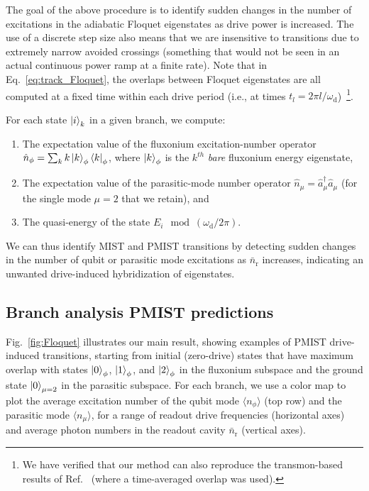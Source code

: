 \documentclass[%
reprint,
superscriptaddress,
 amsmath,amssymb,
 aps,
 prx,
longbibliography,
floatfix,
]{revtex4-2}
\begin{document}
The goal of the above procedure is to identify sudden changes in the number of excitations in the adiabatic Floquet eigenstates as drive power is increased.  
The use of a discrete step size also means that we are insensitive to transitions due to extremely narrow avoided crossings (something that would not be seen in an actual continuous power ramp at a finite rate). Note that in Eq.~\ref{eq:track_Floquet}, the overlaps between Floquet eigenstates are all computed at a fixed time within each drive period (i.e., at times $t_l = 2 \pi l/ \omega_\textrm{d}$)~\footnote{We have verified that our method can also reproduce the transmon-based results of Ref.~\cite{dumas2024unified} (where a time-averaged overlap was used).}. 


For each state $\ket{i}_k$ in a given branch, we compute:
\begin{enumerate}
    \item The expectation value of the fluxonium excitation-number operator $\hat n_\phi=\sum_k k\ket{k}_\phi\bra{k}_\phi$, where $\ket{k}_\phi$ is the $k^{th}$ {\it bare} fluxonium energy eigenstate,
    \item The expectation value of the parasitic-mode number operator $\hat n_\mu=\hat a_{\mu}^\dagger \hat a_{\mu}$ (for the single mode $\mu=2$ that we retain), and 
    \item The quasi-energy of the state $E_i \mod (\omega_\textrm{d}/2\pi)$.
\end{enumerate}
We can thus identify MIST and PMIST transitions by detecting sudden changes in the number of qubit or parasitic mode excitations as $\bar{n}_\textrm{r}$ increases, indicating an unwanted drive-induced hybridization of eigenstates.


\subsection{Branch analysis PMIST predictions}

Fig.~\ref{fig:Floquet} illustrates our main result, showing examples of PMIST drive-induced transitions, starting from initial (zero-drive) states that have maximum overlap with states $\ket{0}_\phi$, $\ket{1}_\phi$, and $\ket{2}_\phi$ in the fluxonium subspace and the ground state $\ket{0}_{\mu=2}$ in the parasitic subspace. For each branch, we use a color map to plot the average excitation number of the qubit mode $\langle n_\phi \rangle$ (top row) and the parasitic mode $\langle n_\mu \rangle$, for a range of readout drive frequencies (horizontal axes) and average photon numbers in the readout cavity $ \bar n_\textrm{r}$ (vertical axes). 
\end{document}
